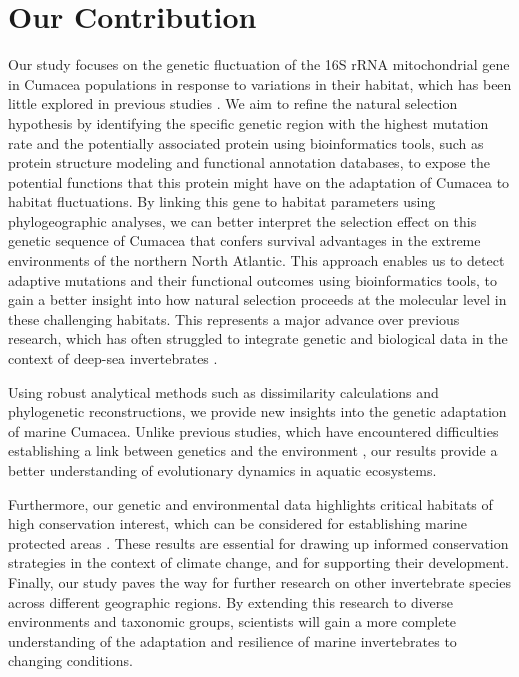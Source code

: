 \section{Our Contribution}\label{contribution}
Our study focuses on the genetic fluctuation of the 16S rRNA mitochondrial gene in Cumacea populations in response to variations in their habitat, which has been little explored in previous studies \citep{grassle1992deep, rex2000latitudinal}. We aim to refine the natural selection hypothesis by identifying the specific genetic region with the highest mutation rate and the potentially associated protein using bioinformatics tools, such as protein structure modeling and functional annotation databases, to expose the potential functions that this protein might have on the adaptation of Cumacea to habitat fluctuations. By linking this gene to habitat parameters using phylogeographic analyses, we can better interpret the selection effect on this genetic sequence of Cumacea that confers survival advantages in the extreme environments of the northern North Atlantic. This approach enables us to detect adaptive mutations and their functional outcomes using bioinformatics tools, to gain a better insight into how natural selection proceeds at the molecular level in these challenging habitats. This represents a major advance over previous research, which has often struggled to integrate genetic and biological data in the context of deep-sea invertebrates \citep{etter1990population, vrijenhoek2009cryptic}.

Using robust analytical methods such as dissimilarity calculations and phylogenetic reconstructions, we provide new insights into the genetic adaptation of marine Cumacea. Unlike previous studies, which have encountered difficulties establishing a link between genetics and the environment \citep{manel2003landscape, balkenhol2009statistical}, our results provide a better understanding of evolutionary dynamics in aquatic ecosystems.

Furthermore, our genetic and environmental data highlights critical habitats of high conservation interest, which can be considered for establishing marine protected areas \citep{levin2009ecological}. These results are essential for drawing up informed conservation strategies in the context of climate change, and for supporting their development. Finally, our study paves the way for further research on other invertebrate species across different geographic regions. By extending this research to diverse environments and taxonomic groups, scientists will gain a more complete understanding of the adaptation and resilience of marine invertebrates to changing conditions. 

